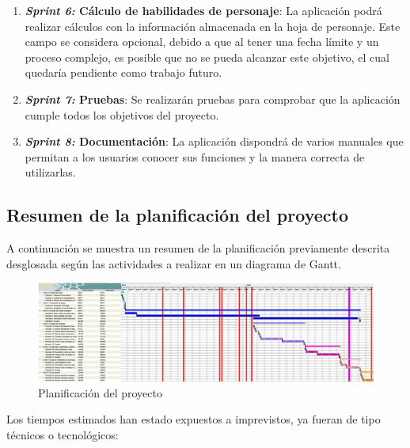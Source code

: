 \begin{enumerate}
    \item \textbf{\textit{Sprint 6:} Cálculo de habilidades de personaje}: La aplicación podrá realizar 
    cálculos con la información almacenada en la hoja de personaje. Este campo se considera opcional, debido a que 
    al tener una fecha límite y un proceso complejo, es posible que no se pueda alcanzar este objetivo, el cual quedaría 
    pendiente como trabajo futuro.

    \item \textbf{\textit{Sprint 7:} Pruebas}: Se realizarán pruebas para comprobar que la aplicación cumple todos los 
    objetivos del proyecto.

    \item \textbf{\textit{Sprint 8:} Documentación}: La aplicación dispondrá de varios manuales que permitan a los 
    usuarios conocer sus funciones y la manera correcta de utilizarlas.

\end{enumerate}

\subsection{Resumen de la planificación del proyecto}
A continuación se muestra un resumen de la planificación previamente descrita desglosada según 
las actividades a realizar en un diagrama de Gantt.

\newpage

\begin{landscape}
    \begin{figure}[H]
        \centering
        \includegraphics[scale=0.5]{Project_Planning/ARPEGOS_Gantt.png}
        \caption{Planificación del proyecto}
    \end{figure}
\end{landscape}
        

Los tiempos estimados han estado expuestos a imprevistos, ya fueran de tipo técnicos o tecnológicos:

